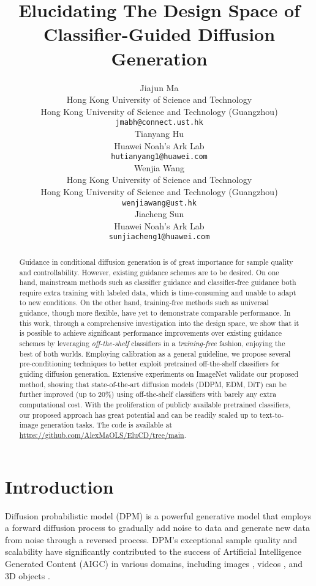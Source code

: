 \documentclass{article}
\title{Elucidating The Design Space of Classifier-Guided Diffusion Generation}
\author{
  Jiajun Ma \\
  Hong Kong University of Science and Technology\\
   Hong Kong University of Science and Technology (Guangzhou)\\
  \texttt{jmabh@connect.ust.hk} \\
  \And
  Tianyang Hu \\
  Huawei Noah's Ark Lab \\
  \texttt{hutianyang1@huawei.com} \\
  \AND
  Wenjia Wang \\
  Hong Kong University of Science and Technology \\
  Hong Kong University of Science and Technology (Guangzhou)\\
  \texttt{wenjiawang@ust.hk} \\
  \And
  Jiacheng Sun \\
  Huawei Noah's Ark Lab \\
  \texttt{sunjiacheng1@huawei.com} \\
}
\theoremstyle{definition}
\begin{document}
\maketitle


\begin{abstract}
Guidance in conditional diffusion generation is of great importance for sample quality and controllability. 
However, existing guidance schemes are to be desired. 
On one hand, mainstream methods such as classifier guidance and classifier-free guidance both require extra training with labeled data, which is time-consuming and unable to adapt to new conditions.
On the other hand, training-free methods such as universal guidance, though more flexible, have yet to demonstrate comparable performance. 
In this work, through a comprehensive investigation into the design space, we show that it is possible to achieve significant performance improvements over existing guidance schemes by leveraging \textit{off-the-shelf} classifiers in a \textit{training-free} fashion, enjoying the best of both worlds. 
Employing calibration as a general guideline, we propose several pre-conditioning techniques to better exploit pretrained off-the-shelf classifiers for guiding diffusion generation. 
Extensive experiments on ImageNet validate our proposed method, showing that state-of-the-art diffusion models (DDPM, EDM, DiT) can be further improved (up to 20\%) using off-the-shelf classifiers with barely any extra computational cost.
With the proliferation of publicly available pretrained classifiers, our proposed approach has great potential and can be readily scaled up to text-to-image generation tasks. 
The code is available at \url{https://github.com/AlexMaOLS/EluCD/tree/main}.
\end{abstract}



\section{Introduction}
Diffusion probabilistic model (DPM) \citep{sohl2015deep, ho2020denoising, song2020score} is a powerful generative model that employs a forward diffusion process to gradually add noise to data and generate new data from noise through a reversed process. DPM's exceptional sample quality and scalability have significantly contributed to the success of Artificial Intelligence Generated Content (AIGC) in various domains, including images \citep{saharia2022photorealistic, ramesh2022hierarchical, ramesh2021zero, rombach2022high}, videos \citep{ho2022video, singer2022make, ho2022imagen, Molad2023DreamixVD}, and 3D objects \citep{poole2022dreamfusion, lin2023magic3d, wang2023prolificdreamer}.
 
\end{document}
